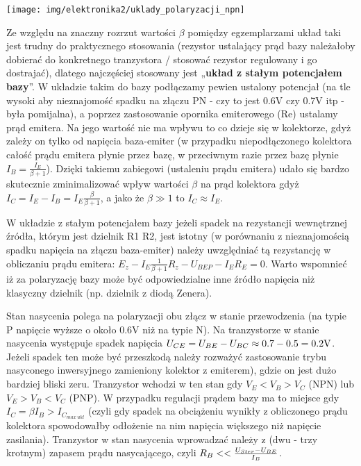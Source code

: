 \documentclass{pdfBooklets}
\begin{document}
\begin{center}\texttt{[image: img/elektronika2/uklady\_polaryzacji\_npn]}\end{center}

Ze względu na znaczny rozrzut wartości $\beta$ pomiędzy egzemplarzami układ taki jest trudny do praktycznego stosowania (rezystor ustalający prąd bazy należałoby dobierać do konkretnego tranzystora / stosować rezystor regulowany i go dostrajać), dlatego najczęściej stosowany jest „{\bf układ z stałym potencjałem bazy}”.
W układzie takim do bazy podłączamy pewien ustalony potencjał (na tle wysoki aby nieznajomość spadku na złączu PN - czy to jest 0.6V czy 0.7V itp - była pomijalna), a poprzez zastosowanie opornika emiterowego (Re) ustalamy prąd emitera.
Na jego wartość nie ma wpływu to co dzieje się w kolektorze, gdyż zależy on tylko od napięcia baza-emiter (w przypadku niepodłączonego kolektora całość prądu emitera płynie przez bazę, w przeciwnym razie przez bazę płynie $I_B = \frac{I_E}{\beta + 1}$).
Dzięki takiemu zabiegowi (ustaleniu prądu emitera) udało się bardzo skutecznie zminimalizować wpływ wartości $\beta$ na prąd kolektora gdyż $I_C = I_E - I_B = I_E \frac{\beta}{\beta+1}$, a jako że $\beta \gg 1$ to $I_C \approx I_E$.

W układzie z stałym potencjałem bazy jeżeli spadek na rezystancji wewnętrznej źródła, którym jest dzielnik R1 R2, jest istotny (w porównaniu z nieznajomością spadku napięcia na złączu baza-emiter) należy uwzględniać tą rezystancję w obliczaniu prądu emitera: $E_z - I_E\frac{1}{\beta + 1}R_z - U_{BEP} - I_ER_E = 0$.
Warto wspomnieć iż za polaryzację bazy może być odpowiedzialne inne źródło napięcia niż klasyczny dzielnik (np. dzielnik z diodą Zenera).



Stan nasycenia polega na polaryzacji obu złącz w stanie przewodzenia (na typie P napięcie wyższe o około 0.6V niż na typie N).
Na tranzystorze w stanie nasycenia występuje spadek napięcia $U_{CE} = U_{BE} - U_{BC} \approx 0.7 - 0.5 = 0.2\rm{V}$.
Jeżeli spadek ten może być przeszkodą należy rozważyć zastosowanie trybu nasyconego inwersyjnego zamieniony kolektor z emiterem), gdzie on jest dużo bardziej bliski zeru.
Tranzystor wchodzi w ten stan gdy $V_E < V_B > V_C$ (NPN) lub $V_E > V_B < V_C$ (PNP).
W przypadku regulacji prądem bazy ma to miejsce gdy $I_C = \beta I_B > I_{C_{max\ ukl}}$ (czyli gdy spadek na obciążeniu wynikły z obliczonego prądu kolektora spowodowałby odłożenie na nim napięcia większego niż napięcie zasilania).
Tranzystor w stan nasycenia wprowadzać należy z (dwu - trzy krotnym) zapasem prądu nasycającego, czyli $R_B << {U_{Ster}-U_{BE} \over I_B}$.
\end{document}
